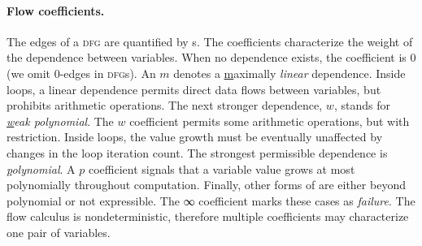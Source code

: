 \paragraph*{Flow coefficients.}
The edges of a \textsc{dfg} are quantified by {s}. The
coefficients characterize the weight of the dependence between variables. When
no dependence exists, the coefficient is \(0\) (we omit \(0\)-edges
in \textsc{dfg}s). An \(m\) denotes a
\underline{m}aximally \emph{linear} dependence. Inside loops, a linear
dependence permits direct data flows between variables, but prohibits arithmetic
operations. The next stronger dependence, \(w\), stands for
\emph{\underline{w}eak polynomial}. The \(w\) coefficient permits some
arithmetic operations, but with restriction. Inside loops, the value growth must
be eventually unaffected by changes in the loop iteration count. The strongest
permissible dependence is \emph{\underline{p}olynomial}. A \(p\)
coefficient signals that a variable value grows at most polynomially throughout
computation. Finally, other forms of  are either beyond
polynomial or not expressible. The ∞ coefficient marks these cases
as \emph{failure}. The flow calculus is
nondeterministic, therefore multiple coefficients may
characterize one pair of variables.

